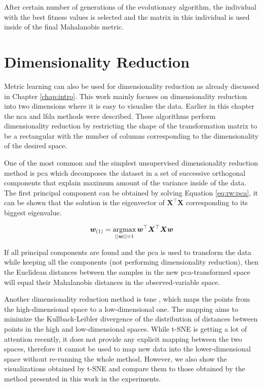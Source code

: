 \documentclass[12pt,a4paper]{report}
\begin{document}
After certain number of generations of the evolutionary algorithm, the individual with the best fitness values is selected and the matrix in this individual is used inside of the final Mahalanobis metric.

\section{Dimensionality Reduction}

Metric learning can also be used for dimensionality reduction as already discussed in Chapter \ref{chap:intro}. This work mainly focuses on dimensionality reduction into two dimensions where it is easy to visualise the data. Earlier in this chapter the \ac{nca} and \ac{lfda} methods were described. These algorithms perform dimensionality reduction by restricting the shape of the transformation matrix to be a rectangular with the number of columns corresponding to the dimensionality of the desired space.

One of the most common and the simplest unsupervised dimensionality reduction method is \ac{pca} \citep{jolliffe2002principal} which decomposes the dataset in a set of successive orthogonal components that explain maximum amount of the variance inside of the data. The first principal component can be obtained by solving Equation \ref{eq:rw:pca}, it can be shown that the solution is the eigenvector of $\bm{X}^\top\bm{X}$ corresponding to its biggest eigenvalue.

\begin{equation} 
\bm{w}_{(1)} = \operatorname*{argmax}_{||\bm{w}||=1} \bm{w}^\top\bm{X}^\top\bm{X}\bm{w} \label{eq:rw:pca}
\end{equation}

If all principal components are found and the \ac{pca} is used to transform the data while keeping all the components (not performing dimensionality reduction), then the Euclidean distances between the samples in the new \ac{pca}-transformed space will equal their Mahalanobis distances in the observed-variable space.

Another dimensionality reduction method is \ac{tsne} \citep{maaten2008visualizing}, which maps the points from the high-dimensional space to a low-dimensional one. The mapping aims to minimize the Kullback-Leibler divergence of the distribution of distances between points in the high and low-dimensional spaces. While t-SNE is getting a lot of attention recently, it does not provide any explicit mapping between the two spaces, therefore it cannot be used to map new data into the lower-dimensional space without re-running the whole method. However, we also show the visualizations obtained by t-SNE and compare them to those obtained by the method presented in this work in the experiments.
\end{document}
